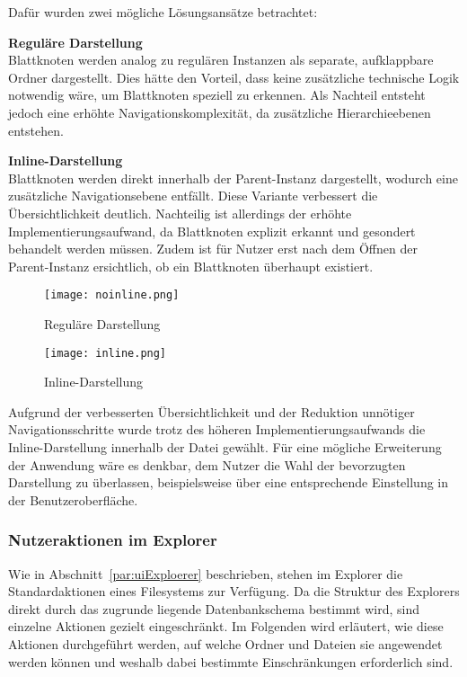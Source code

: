 Dafür wurden zwei mögliche Lösungsansätze betrachtet:

\textbf{Reguläre Darstellung}\\
Blattknoten werden analog zu regulären Instanzen als separate, aufklappbare Ordner dargestellt. Dies hätte den Vorteil, dass keine zusätzliche technische Logik notwendig wäre, um Blattknoten speziell zu erkennen. Als Nachteil entsteht jedoch eine erhöhte Navigationskomplexität, da zusätzliche Hierarchieebenen entstehen.

\textbf{Inline-Darstellung}\\
Blattknoten werden direkt innerhalb der Parent-Instanz dargestellt, wodurch eine zusätzliche Navigationsebene entfällt. Diese Variante verbessert die Übersichtlichkeit deutlich. Nachteilig ist allerdings der erhöhte Implementierungsaufwand, da Blattknoten explizit erkannt und gesondert behandelt werden müssen. Zudem ist für Nutzer erst nach dem Öffnen der Parent-Instanz ersichtlich, ob ein Blattknoten überhaupt existiert.

\begin{figure}[H]
    \centering
      \begin{minipage}{0.45\textwidth}
        \centering
        \texttt{[image: noinline.png]}
        \caption{Reguläre Darstellung}
        \label{fig:noinline}
    \end{minipage}\hfill
    \begin{minipage}{0.45\textwidth}
        \centering
        \texttt{[image: inline.png]}
        \caption{Inline-Darstellung}
        \label{fig:inline}
    \end{minipage}
\end{figure}

Aufgrund der verbesserten Übersichtlichkeit und der Reduktion unnötiger Navigationsschritte wurde trotz des höheren Implementierungsaufwands die Inline-Darstellung innerhalb der Datei gewählt. Für eine mögliche Erweiterung der Anwendung wäre es denkbar, dem Nutzer die Wahl der bevorzugten Darstellung zu überlassen, beispielsweise über eine entsprechende Einstellung in der Benutzeroberfläche.

\newpage
\subsubsection*{Nutzeraktionen im Explorer}
\label{sec:Nutzeraktionen}
Wie in Abschnitt~\ref{par:uiExploerer} beschrieben, stehen im Explorer die Standardaktionen eines Filesystems zur Verfügung. Da die Struktur des Explorers direkt durch das zugrunde liegende Datenbankschema bestimmt wird, sind einzelne Aktionen gezielt eingeschränkt. Im Folgenden wird erläutert, wie diese Aktionen durchgeführt werden, auf welche Ordner und Dateien sie angewendet werden können und weshalb dabei bestimmte Einschränkungen erforderlich sind.

